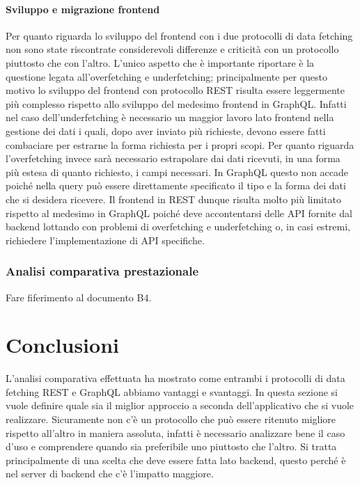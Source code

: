 \paragraph{Sviluppo e migrazione frontend}
Per quanto riguarda lo sviluppo del frontend con i due protocolli di data fetching non sono state riscontrate considerevoli differenze e criticità con un protocollo piuttosto che con l'altro. L'unico aspetto che è importante riportare è la questione legata all'overfetching e underfetching; principalmente per questo motivo lo sviluppo del frontend con protocollo REST risulta essere leggermente più complesso rispetto allo sviluppo del medesimo frontend in GraphQL. Infatti nel caso dell'underfetching è necessario un maggior lavoro lato frontend nella gestione dei dati i quali, dopo aver inviato più richieste, devono essere fatti combaciare per estrarne la forma richiesta per i propri scopi. Per quanto riguarda l'overfetching invece sarà necessario estrapolare dai dati ricevuti, in una forma più estesa di quanto richiesto, i campi necessari. In GraphQL questo non accade poiché nella query può essere direttamente specificato il tipo e la forma dei dati che si desidera ricevere. Il frontend in REST dunque risulta molto più limitato rispetto al medesimo in GraphQL poiché deve accontentarsi delle API fornite dal backend lottando con problemi di overfetching e underfetching o, in casi estremi, richiedere l'implementazione di API specifiche.
\subsubsection{Analisi comparativa prestazionale}
Fare fiferimento al documento B4.
\section{Conclusioni}
L'analisi comparativa effettuata ha mostrato come entrambi i protocolli di data fetching REST e GraphQL abbiamo vantaggi e svantaggi. In questa sezione si vuole definire quale sia il miglior approccio a seconda dell'applicativo che si vuole realizzare. Sicuramente non c'è un protocollo che può essere ritenuto migliore rispetto all'altro in maniera assoluta, infatti è necessario analizzare bene il caso d'uso e comprendere quando sia preferibile uno piuttosto che l'altro. Si tratta principalmente di una scelta che deve essere fatta lato backend, questo perché è nel server di backend che c'è l'impatto maggiore.
